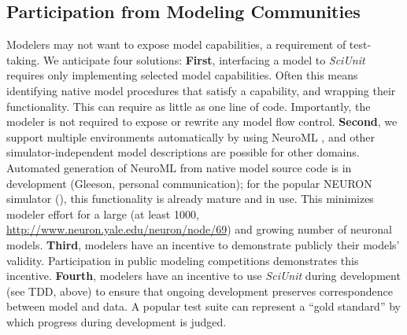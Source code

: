 \documentclass{frontiersSCNS}
\begin{document}
\subsection{Participation from Modeling Communities}
Modelers may not want to expose model capabilities, a requirement of test-taking.  
We anticipate four solutions: \textbf{First}, interfacing a model to \textit{SciUnit} requires only implementing selected model capabilities. 
Often this means identifying native model procedures that satisfy a capability, and wrapping their functionality. 
This can require as little as one line of code. 
Importantly, the modeler is not required to expose or rewrite any model flow control. 
\textbf{Second}, we support multiple environments automatically by using NeuroML \citep{gleeson_neuroml:_2010}, and other simulator-independent model descriptions are possible for other domains. 
Automated generation of NeuroML from native model source code is in development (Gleeson, personal communication); for the popular NEURON simulator (\cite{carnevale_neuron_2006}), this functionality is already mature and in use. 
This minimizes modeler effort for a large (at least 1000, \url{http://www.neuron.yale.edu/neuron/node/69}) and growing number of neuronal models. 
\textbf{Third}, modelers have an incentive to demonstrate publicly their models' validity. 
Participation in public modeling competitions demonstrates this incentive. 
\textbf{Fourth}, modelers have an incentive to use \textit{SciUnit} during development (see TDD, above) to ensure that ongoing development preserves correspondence between model and data. 
A popular test suite can represent a ``gold standard'' by which progress during development is judged.
\end{document}
